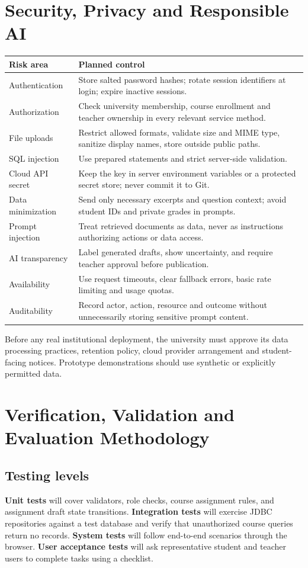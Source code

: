 \documentclass[11pt,a4paper]{article}
\begin{document}
\section{Security, Privacy and Responsible AI}
\begin{longtable}{p{}p{}}
\toprule Risk area & Planned control\\\midrule\endhead
Authentication & Store salted password hashes; rotate session identifiers at login; expire inactive sessions.\\
Authorization & Check university membership, course enrollment and teacher ownership in every relevant service method.\\
File uploads & Restrict allowed formats, validate size and MIME type, sanitize display names, store outside public paths.\\
SQL injection & Use prepared statements and strict server-side validation.\\
Cloud API secret & Keep the key in server environment variables or a protected secret store; never commit it to Git.\\
Data minimization & Send only necessary excerpts and question context; avoid student IDs and private grades in prompts.\\
Prompt injection & Treat retrieved documents as data, never as instructions authorizing actions or data access.\\
AI transparency & Label generated drafts, show uncertainty, and require teacher approval before publication.\\
Availability & Use request timeouts, clear fallback errors, basic rate limiting and usage quotas.\\
Auditability & Record actor, action, resource and outcome without unnecessarily storing sensitive prompt content.\\
\bottomrule
\end{longtable}
Before any real institutional deployment, the university must approve its data processing practices, retention policy, cloud provider arrangement and student-facing notices. Prototype demonstrations should use synthetic or explicitly permitted data.

\section{Verification, Validation and Evaluation Methodology}
\subsection{Testing levels}
\textbf{Unit tests} will cover validators, role checks, course assignment rules, and assignment draft state transitions. \textbf{Integration tests} will exercise JDBC repositories against a test database and verify that unauthorized course queries return no records. \textbf{System tests} will follow end-to-end scenarios through the browser. \textbf{User acceptance tests} will ask representative student and teacher users to complete tasks using a checklist.
\end{document}
